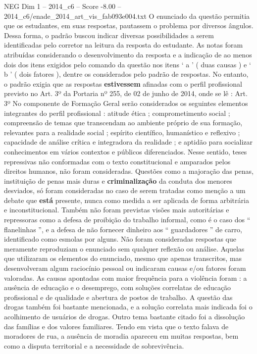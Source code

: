 \begin{textsample}{NEG Dim 1 – 2014\_c6 – Score -8.00 – 2014\_c6/enade\_2014\_art\_vis\_fab093e004.txt}
O enunciado da questão permitia que os estudantes, em suas respostas, pautassem o problema por diversos ângulos.
Dessa forma, o padrão buscou indicar diversas possibilidades a serem identificadas pelo corretor na leitura da resposta do estudante.
As notas foram atribuídas considerando o desenvolvimento da resposta e a indicação de ao menos dois dos itens exigidos pelo comando da questão nos itens ‘ a ’ ( duas causas ) e ‘ b ’ ( dois fatores ), dentre os considerados pelo padrão de respostas.
No entanto, o padrão exigia que as respostas \textbf{estivessem} afinadas com o perfil profissional previsto no Art. 3º da Portaria nº 255, de 02 de junho de 2014, onde se lê : Art. 3º No componente de Formação Geral serão considerados os seguintes elementos integrantes do perfil profissional : atitude ética ; comprometimento social ; compreensão de temas que transcendam ao ambiente próprio de sua formação, relevantes para a realidade social ; espírito científico, humanístico e reflexivo ; capacidade de análise crítica e integradora da realidade ; e aptidão para socializar conhecimentos em vários contextos e públicos diferenciados.
Nesse sentido, teses repressivas não conformadas com o texto constitucional e amparados pelos direitos humanos, não foram consideradas.
Questões como a majoração das penas, instituição de penas mais duras e \textbf{criminalização} da conduta dos menores desviados, só foram consideradas no caso de serem tratadas como menção a um debate que \textbf{está} presente, nunca como medida a ser aplicada de forma arbitrária e inconstitucional.
Também não foram previstas visões mais autoritárias e repressoras como a defesa de proibição do trabalho informal, como é o caso dos “ flanelinhas ”, e a defesa de não fornecer dinheiro aos “ guardadores ” de carro, identificado como esmolas por alguns.
Não foram consideradas respostas que meramente reproduziam o enunciado sem qualquer reflexão ou análise.
Aquelas que utilizaram os elementos do enunciado, mesmo que apenas transcritos, mas desenvolveram algum raciocínio pessoal ou indicaram causas e/ou fatores foram valoradas.
As causas apontadas com maior frequência para a violência foram : a ausência de educação e o desemprego, com soluções correlatas de educação profissional e de qualidade e abertura de postos de trabalho.
A questão das drogas também foi bastante mencionada, e a solução correlata mais indicada foi o acolhimento de usuários de drogas.
Outro tema bastante citado foi a dissolução das famílias e dos valores familiares.
Tendo em vista que o texto falava de moradores de rua, a ausência de moradia apareceu em muitas respostas, bem como a disputa territorial e a necessidade de sobrevivência.

\end{textsample}
